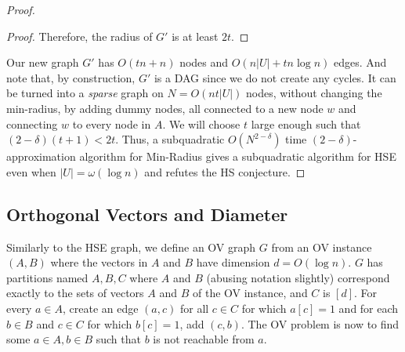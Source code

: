 \begin{proof}
\begin{proof}
Therefore, the radius of $G'$ is at least $2t$.
\end{proof}

Our new graph $G'$ has $O(tn+n)$ nodes and $O(n|U| + tn\log{n})$ edges.
And note that, by construction, $G'$ is a DAG since we do not create any cycles.
It can be turned into a \emph{sparse} graph on $N=O(nt|U|)$ nodes, without changing the min-radius, by adding dummy nodes, all connected to a new node $w$ and connecting $w$ to every node in $A$.
We will choose $t$ large enough such that $(2-\delta)(t+1)<2t$.
Thus, a subquadratic $O(N^{2-\delta})$ time $(2-\delta)$-approximation algorithm for Min-Radius gives a subquadratic algorithm for HSE even when $|U|=\omega(\log{n})$ and refutes the HS conjecture.
\end{proof}


\subsection{Orthogonal Vectors and Diameter}
Similarly to the HSE graph, we define an OV graph $G$ from an OV instance $(A,B)$ where the vectors in $A$ and $B$ have dimension $d=O(\log n)$. $G$ has partitions named $A,B,C$ where $A$ and $B$ (abusing notation slightly) correspond exactly to the sets of vectors $A$ and $B$ of the OV instance, and $C$ is $[d]$. For every $a\in A$, create an edge $(a,c)$ for all $c\in C$ for which $a[c]=1$ and for each $b\in B$ and $c\in C$ for which $b[c]=1$, add $(c,b)$. The OV problem is now to find some $a\in A, b\in B$ such that $b$ is not reachable from $a$.


